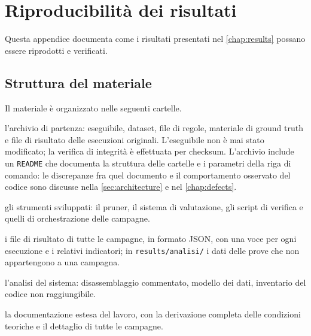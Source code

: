 \chapter{Riproducibilità dei risultati}\label{app:reproducibility}
\begingroup{} \pagestyle{appendices}\endgroup

\noindent Questa appendice documenta come i risultati presentati nel
\autoref{chap:results} possano essere riprodotti e verificati.

\section{Struttura del materiale}\label{sec:appendix-layout}

Il materiale è organizzato nelle seguenti cartelle.

\begin{description}[leftmargin=0em]
    \item[\texttt{RENUVER/}] l'archivio di partenza: eseguibile, dataset, file di regole,
    materiale di ground truth e file di risultato delle esecuzioni originali. L'eseguibile non è
    mai stato modificato; la verifica di integrità è effettuata per checksum. L'archivio include
    un \texttt{README} che documenta la struttura delle cartelle e i parametri della riga di
    comando: le discrepanze fra quel documento e il comportamento osservato del codice sono
    discusse nella \autoref{sec:architecture} e nel \autoref{chap:defects}.
    \item[\texttt{pruning/}] gli strumenti sviluppati: il pruner, il sistema di valutazione, gli
    script di verifica e quelli di orchestrazione delle campagne.
    \item[\texttt{results/}] i file di risultato di tutte le campagne, in formato JSON, con una
    voce per ogni esecuzione e i relativi indicatori; in \texttt{results/analisi/} i dati delle
    prove che non appartengono a una campagna.
    \item[\texttt{analisi/}] l'analisi del sistema: disassemblaggio commentato, modello dei dati,
    inventario del codice non raggiungibile.
    \item[\texttt{report.md}] la documentazione estesa del lavoro, con la derivazione completa
    delle condizioni teoriche e il dettaglio di tutte le campagne.
\end{description}

